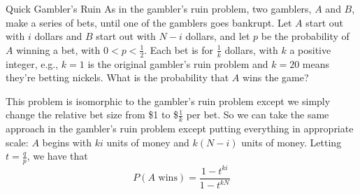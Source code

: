 \documentclass[11pt]{article}
\begin{document}
\begin{exercise}{Quick Gambler's Ruin} 
As in the gambler's ruin problem, two gamblers, $A$ and $B$, make a series of bets, until one of the gamblers goes bankrupt. Let $A$ start out with $i$ dollars and $B$ start out with $N-i$ dollars, and let $p$ be the probability of $A$ winning a bet, with $0 < p < \frac{1}{2}$. Each bet is for $\frac{1}{k}$ dollars, with $k$ a positive integer, e.g., $k=1$ is the original gambler's ruin problem and $k = 20$ means they're betting nickels. What is the probability that $A$ wins the game?
\end{exercise}
\begin{solution}{2}
This problem is isomorphic to the gambler's ruin problem except we simply change the relative bet size from \$1 to \$$\frac{1}{k}$ per bet. So we can take the same approach in the gambler's ruin problem except putting everything in appropriate scale: $A$ begins with $ki$ units of money and $k(N-i)$ units of money. Letting $t = \frac{q}{p}$, we have that 
    $$P(\text{$A$ wins}) = \frac{1 - t^{ki}}{1-t^{kN}}$$
\end{solution}
\end{document}
